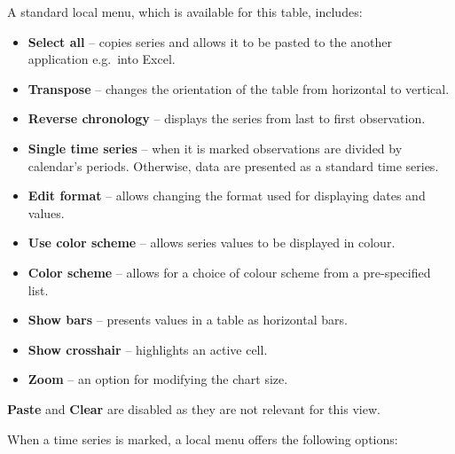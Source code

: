 \documentclass[
  letterpaper,
  DIV=11,
  numbers=noendperiod]{scrreprt}
\begin{document}
A standard local menu, which is available for this table, includes:

\begin{itemize}
\item
  \textbf{Select all} -- copies series and allows it to be pasted to the
  another application e.g.~into Excel.
\item
  \textbf{Transpose} -- changes the orientation of the table from
  horizontal to vertical.
\item
  \textbf{Reverse chronology} -- displays the series from last to first
  observation.
\item
  \textbf{Single time series} -- when it is marked observations are
  divided by calendar's periods. Otherwise, data are presented as a
  standard time series.
\item
  \textbf{Edit format} -- allows changing the format used for displaying
  dates and values.
\item
  \textbf{Use color scheme} -- allows series values to be displayed in
  colour.
\item
  \textbf{Color scheme} -- allows for a choice of colour scheme from a
  pre-specified list.
\item
  \textbf{Show bars} -- presents values in a table as horizontal bars.
\item
  \textbf{Show crosshair} -- highlights an active cell.
\item
  \textbf{Zoom} -- an option for modifying the chart size.
\end{itemize}

\textbf{Paste} and \textbf{Clear} are disabled as they are not relevant
for this view.

When a time series is marked, a local menu offers the following options:
\end{document}
